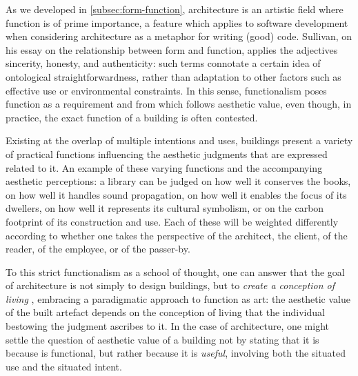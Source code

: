 As we developed in \ref{subsec:form-function}, architecture is an artistic field where function is of prime importance, a feature which applies to software development when considering architecture as a metaphor for writing (good) code. Sullivan, on his essay on the relationship between form and function, applies the adjectives sincerity, honesty, and authenticity: such terms connotate a certain idea of ontological straightforwardness, rather than adaptation to other factors such as effective use or environmental constraints. In this sense, functionalism poses function as a requirement and from which follows aesthetic value, even though, in practice, the exact function of a building is often contested.

Existing at the overlap of multiple intentions and uses, buildings present a variety of practical functions influencing the aesthetic judgments that are expressed related to it. An example of these varying functions and the accompanying aesthetic perceptions: a library can be judged on how well it conserves the books, on how well it handles sound propagation, on how well it enables the focus of its dwellers, on how well it represents its cultural symbolism, or on the carbon footprint of its construction and use. Each of these will be weighted differently according to whether one takes the perspective of the architect, the client, of the reader, of the employee, or of the passer-by.

To this strict functionalism as a school of thought,  one can answer that the goal of architecture is not simply to design buildings, but to \emph{create a conception of living} \citep{graham_architecture_2000}, embracing a paradigmatic approach to function as art: the aesthetic value of the built artefact depends on the conception of living that the individual bestowing the judgment ascribes to it. In the case of architecture, one might settle the question of aesthetic value of  a building not by stating that it is because is functional, but rather because it is \emph{useful}, involving both the situated use and the situated intent.

